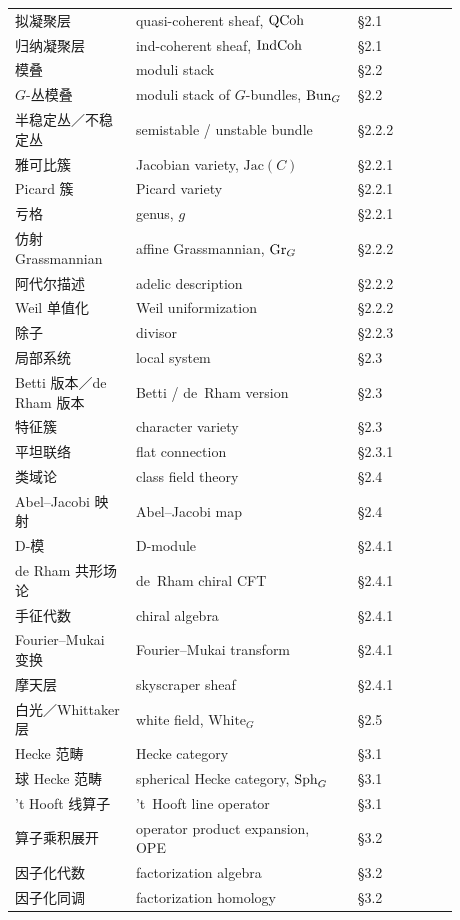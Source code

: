 \begin{center}
\begin{longtable}{@{}>{\raggedright\arraybackslash}p{0.24\linewidth}>{\raggedright\arraybackslash}p{0.44\linewidth}>{\raggedright\arraybackslash}p{0.20\linewidth}@{}}
拟凝聚层 & quasi-coherent sheaf, $\operatorname{QCoh}$ & §2.1 \\
归纳凝聚层 & ind-coherent sheaf, $\operatorname{IndCoh}$ & §2.1 \\
模叠 & moduli stack & §2.2 \\
$G$-丛模叠 & moduli stack of $G$-bundles, $\operatorname{Bun}_{G}$ & §2.2 \\
半稳定丛／不稳定丛 & semistable / unstable bundle & §2.2.2 \\
雅可比簇 & Jacobian variety, $\mathrm{Jac}(C)$ & §2.2.1 \\
Picard 簇 & Picard variety & §2.2.1 \\
亏格 & genus, $g$ & §2.2.1 \\
仿射 Grassmannian & affine Grassmannian, $\operatorname{Gr}_{G}$ & §2.2.2 \\
阿代尔描述 & adelic description & §2.2.2 \\
Weil 单值化 & Weil uniformization & §2.2.2 \\
除子 & divisor & §2.2.3 \\
局部系统 & local system & §2.3 \\
Betti 版本／de Rham 版本 & Betti / de~Rham version & §2.3 \\
特征簇 & character variety & §2.3 \\
平坦联络 & flat connection & §2.3.1 \\
类域论 & class field theory & §2.4 \\
Abel--Jacobi 映射 & Abel--Jacobi map & §2.4 \\
D-模 & D-module & §2.4.1 \\
de Rham 共形场论 & de~Rham chiral CFT & §2.4.1 \\
手征代数 & chiral algebra & §2.4.1 \\
Fourier--Mukai 变换 & Fourier--Mukai transform & §2.4.1 \\
摩天层 & skyscraper sheaf & §2.4.1 \\
白光／Whittaker 层 & white field, $\mathrm{White}_{G}$ & §2.5 \\
Hecke 范畴 & Hecke category & §3.1 \\
球 Hecke 范畴 & spherical Hecke category, $\operatorname{Sph}_{G}$ & §3.1 \\
't Hooft 线算子 & 't~Hooft line operator & §3.1 \\
算子乘积展开 & operator product expansion, OPE & §3.2 \\
因子化代数 & factorization algebra & §3.2 \\
因子化同调 & factorization homology & §3.2 \\

\end{longtable}
\end{center}
